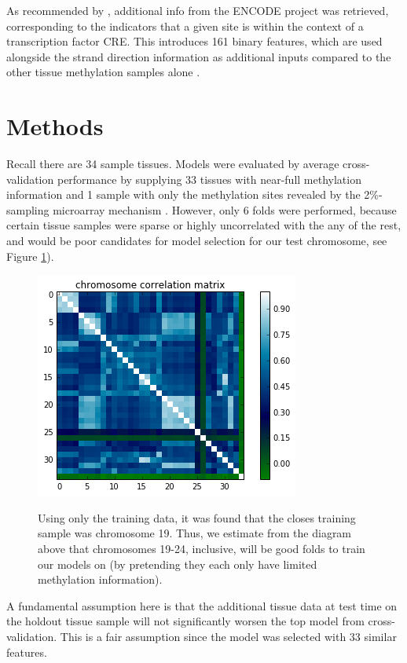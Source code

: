 \documentclass{article} %
\begin{document}
As recommended by \cite{zhang2015predicting}, additional info from the ENCODE project was retrieved, corresponding to the indicators that a given site is within the context of a transcription factor CRE. This introduces 161 binary features, which are used alongside the strand direction information as additional inputs compared to the other tissue methylation samples alone \cite{encode2004encode}.
\section{Methods}

Recall there are 34 sample tissues. Models were evaluated by average cross-validation performance by supplying 33 tissues with near-full methylation information and 1 sample with only the methylation sites revealed by the 2\%-sampling microarray mechanism \cite{infinium}. However, only 6 folds were performed, because certain tissue samples were sparse or highly uncorrelated with the any of the rest, and would be poor candidates for model selection for our test chromosome, see Figure \ref{fig:chromacorr}).

\begin{figure}[H]
    \centering
    \includegraphics[scale=0.3]{chromacorr.png}
    \label{fig:chromacorr}
    \caption{Using only the training data, it was found that the closes training sample was chromosome 19. Thus, we estimate from the diagram above that chromosomes 19-24, inclusive, will be good folds to train our models on (by pretending they each only have limited methylation information).}
\end{figure} 

A fundamental assumption here is that the additional tissue data at test time on the holdout tissue sample will not significantly worsen the top model from cross-validation. This is a fair assumption since the model was selected with 33 similar features.
\end{document}
